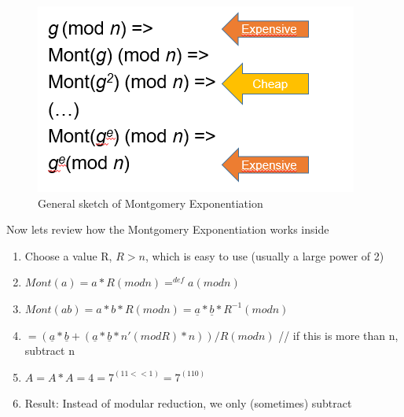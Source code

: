 \begin{figure}[!ht]
    \centering
    \includegraphics[scale=0.7]{images/montg.PNG}
    \caption{General sketch of Montgomery Exponentiation} \label{montg:fig}
\end{figure}

Now lets review how the Montgomery Exponentiation works inside
\begin{enumerate}
	\item  Choose a value R, \(R>n\), which is easy to use (usually a large
	power of 2)
	\item  \(Mont(a)=a*R(mod n) =^{def}  a(mod n)\)
	\item  \(Mont(ab)=a*b*R(mod n)=\underline{a}*\underline{b}*R^{-1} (mod n)\)
	\item  \( = (\underline{a}*\underline{b} +
	(\underline{a}*\underline{b}*n'(mod R)*n))/R(modn) \) \newline
	// if this is more than n, subtract n
	\item  \( A = A*A = 4 = 7^{(11<<1)} = 7^{(110)} \)
	\item  Result: Instead of modular reduction, we only (sometimes) subtract
\end{enumerate}

